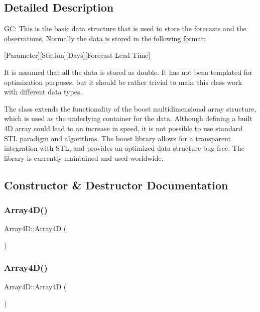 \subsection{Detailed Description}
GC\+: This is the basic data structure that is used to store the forecasts and the observations. Normally the data is stored in the following format\+:

\mbox{[}Parameter\mbox{]}\mbox{[}Station\mbox{]}\mbox{[}Days\mbox{]}\mbox{[}Forecast Lead Time\mbox{]}

It is assumed that all the data is stored as double. It has not been templated for optimization purposes, but it should be rather trivial to make this class work with different data types.

The class extends the functionality of the boost multidimensional array structure, which is used as the underlying container for the data. Although defining a built 4D array could lead to an increase in speed, it is not possible to use standard S\+TL paradigm and algorithms. The boost library allows for a transparent integration with S\+TL, and provides an optimized data structure bug free. The library is currently maintained and used worldwide. 

\subsection{Constructor \& Destructor Documentation}
\mbox{\label{class_array4_d_a1bc84c0dcc22ed0e218040b01f56b816}} 
\subsubsection{\texorpdfstring{Array4\+D()}{Array4D()}\hspace{0.1cm}{\footnotesize\ttfamily [1/5]}}
{\footnotesize\ttfamily Array4\+D\+::\+Array4D (\begin{DoxyParamCaption}{ }\end{DoxyParamCaption})}

\mbox{\label{class_array4_d_a71a55de20984154a6b7e31eec8993a24}} 
\subsubsection{\texorpdfstring{Array4\+D()}{Array4D()}\hspace{0.1cm}{\footnotesize\ttfamily [2/5]}}
{\footnotesize\ttfamily Array4\+D\+::\+Array4D (\begin{DoxyParamCaption}\item[{const \mbox{\hyperlink{class_array4_d}{Array4D}} \&}]{ }\end{DoxyParamCaption})\hspace{0.3cm}{\ttfamily [delete]}}

